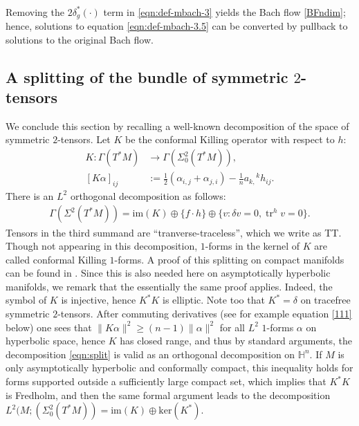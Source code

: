 \documentclass[10pt,reqno]{amsart}
\DeclareMathOperator{\tr}{tr}
\begin{document}
\

Removing the $2 \delta_g^*( \cdot )$ term in \eqref{eqn:def-mbach-3} yields the Bach flow \eqref{BFndim}; hence, solutions to equation \eqref{eqn:def-mbach-3.5} can be converted by
pullback to solutions to the original Bach flow. 

\subsection{A splitting of the bundle of symmetric $2$-tensors} \label{sec:split}
We conclude this section by recalling a well-known decomposition of the space of symmetric $2$-tensors.  Let $K$ be the conformal Killing operator with respect to $h$:
\begin{align} \label{def:conformalKilling}
K: \Gamma( T^*M ) &\longrightarrow \Gamma( \Sigma^2_0( T^*M ) ), \nonumber \\
[K \alpha]_{ij} &:= \frac{1}{2} \left( \alpha_{i,j} + \alpha_{j,i} \right) - \frac{1}{n} {a_{k,}}^k h_{ij}.
\end{align}
There is an $L^2$ orthogonal decomposition  as follows:
\begin{align} \label{eqn:split}
\Gamma( \Sigma^2( T^*M ) )= \mathrm{im}(K) \oplus \{ f \cdot h \} \oplus  \{ v: \delta v =0, \tr^h v = 0 \}.
\end{align}
Tensors in the third summand are ``tranverse-traceless'',  which we write as TT. Though not appearing in this decomposition, $1$-forms in the kernel of $K$ are 
called conformal Killing $1$-forms.  A proof of this splitting on compact manifolds can be found in  \cite[Lemma 3.2] {ViaclovskyPCMI}.  Since this is also
needed here on asymptotically hyperbolic manifolds, we remark that the essentially the same proof applies. Indeed, the symbol of $K$ is injective,  hence
$K^* K$ is elliptic. Note too that $K^* = \delta$ on tracefree symmetric $2$-tensors.  After commuting derivatives (see for example equation \eqref{111} below) 
one sees that $\| K \alpha \|^2 \geq (n-1) \| \alpha\|^2$ for all $L^2$ $1$-forms $\alpha$ on hyperbolic space, hence $K$ has closed range, and thus by 
standard arguments, the decomposition \eqref{eqn:split} is valid as an orthogonal decomposition on $\mathbb H^n$.  If $M$ is only asymptotically hyperbolic and conformally
compact, this inequality holds for forms supported outside a sufficiently large compact set, which implies that $K^* K$ is Fredholm, and then the same
formal argument leads to the decomposition $L^2(M; ( \Sigma_0^2( T^*M ) ) = \mathrm{im}(K) \oplus \mathrm{ker} (K^*).$
\end{document}
